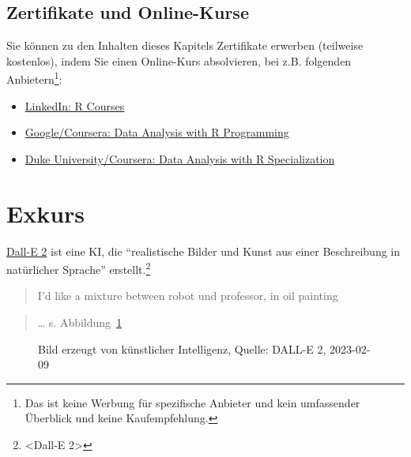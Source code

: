 \documentclass[
  a4paper,
  DIV=11]{scrreprt}
\providecommand{\tightlist}{%
  \setlength{\itemsep}{0pt}\setlength{\parskip}{0pt}}\usepackage{longtable,booktabs,array}
\theoremstyle{definition}
\theoremstyle{definition}
\theoremstyle{definition}
\theoremstyle{remark}
\begin{document}
\subsection{Zertifikate und
Online-Kurse}\label{zertifikate-und-online-kurse}

Sie können zu den Inhalten dieses Kapitels Zertifikate erwerben
(teilweise kostenlos), indem Sie einen Online-Kurs absolvieren, bei z.B.
folgenden Anbietern\footnote{Das ist keine Werbung für spezifische
  Anbieter und kein umfassender Überblick und keine Kaufempfehlung.}:

\begin{itemize}
\tightlist
\item
  \href{https://www.linkedin.com/learning/search?keywords=R}{LinkedIn: R
  Courses}
\item
  \href{https://www.coursera.org/learn/data-analysis-r\#modules}{Google/Coursera:
  Data Analysis with R Programming}
\item
  \href{https://www.coursera.org/specializations/statistics}{Duke
  University/Coursera: Data Analysis with R Specialization}
\end{itemize}

\section{Exkurs}\label{exkurs}

\href{https://openai.com/dall-e-2/}{Dall-E 2} ist eine KI, die
``realistische Bilder und Kunst aus einer Beschreibung in natürlicher
Sprache'' erstellt.\footnote{\textless Dall-E 2\textgreater{}}

\begin{quote}
{} I'd like a mixture between robot und professor, in oil
painting
\end{quote}

\begin{quote}
{} \ldots{} s. Abbildung~\ref{fig-mix-rob-prof}
\end{quote}

\begin{figure}


\caption{\label{fig-mix-rob-prof}Bild erzeugt von künstlicher
Intelligenz, Quelle: DALL-E 2, 2023-02-09}

\end{figure}%
\end{document}
